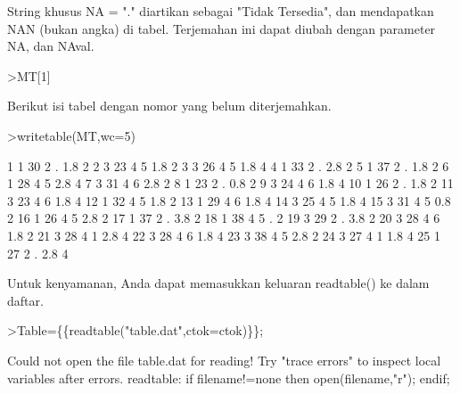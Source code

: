 \documentclass[a4paper,10pt]{article}
\begin{document}
\begin{eulernotebook}
\begin{eulercomment}
\begin{eulercomment}
\begin{eulercomment}
String khusus NA = "." diartikan sebagai "Tidak Tersedia", dan
mendapatkan NAN (bukan angka) di tabel. Terjemahan ini dapat diubah
dengan parameter NA, dan NAval.
\end{eulercomment}
\begin{eulerprompt}
>MT[1]
\end{eulerprompt}
\begin{euleroutput}
  [1,  1,  30,  2,  NAN,  1.8,  2]
\end{euleroutput}
\begin{eulercomment}
Berikut isi tabel dengan nomor yang belum diterjemahkan.
\end{eulercomment}
\begin{eulerprompt}
>writetable(MT,wc=5)
\end{eulerprompt}
\begin{euleroutput}
      1    1   30    2    .  1.8    2
      2    3   23    4    5  1.8    2
      3    3   26    4    5  1.8    4
      4    1   33    2    .  2.8    2
      5    1   37    2    .  1.8    2
      6    1   28    4    5  2.8    4
      7    3   31    4    6  2.8    2
      8    1   23    2    .  0.8    2
      9    3   24    4    6  1.8    4
     10    1   26    2    .  1.8    2
     11    3   23    4    6  1.8    4
     12    1   32    4    5  1.8    2
     13    1   29    4    6  1.8    4
     14    3   25    4    5  1.8    4
     15    3   31    4    5  0.8    2
     16    1   26    4    5  2.8    2
     17    1   37    2    .  3.8    2
     18    1   38    4    5    .    2
     19    3   29    2    .  3.8    2
     20    3   28    4    6  1.8    2
     21    3   28    4    1  2.8    4
     22    3   28    4    6  1.8    4
     23    3   38    4    5  2.8    2
     24    3   27    4    1  1.8    4
     25    1   27    2    .  2.8    4
\end{euleroutput}
\begin{eulercomment}
Untuk kenyamanan, Anda dapat memasukkan keluaran readtable() ke dalam
daftar.
\end{eulercomment}
\begin{eulerprompt}
>Table=\{\{readtable("table.dat",ctok=ctok)\}\};
\end{eulerprompt}
\begin{euleroutput}
  Could not open the file
  table.dat
  for reading!
  Try "trace errors" to inspect local variables after errors.
  readtable:
      if filename!=none then open(filename,"r"); endif;
\end{euleroutput}
\begin{eulercomment}

\end{eulercomment}
\end{eulercomment}
\end{eulercomment}
\end{eulernotebook}
\end{document}
